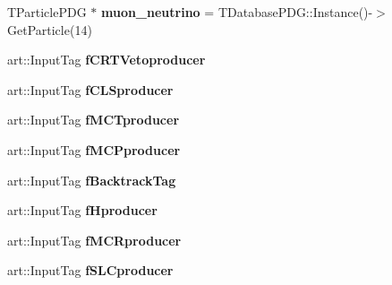 \begin{DoxyCompactItemize}
\item 
\hypertarget{classanalysis_1_1DefaultAnalysis_a0e76c2baabff12b0a3f19aa54c54a59d}{T\-Particle\-P\-D\-G $\ast$ {\bfseries muon\-\_\-neutrino} = T\-Database\-P\-D\-G\-::\-Instance()-\/$>$Get\-Particle(14)}\label{classanalysis_1_1DefaultAnalysis_a0e76c2baabff12b0a3f19aa54c54a59d}

\item 
\hypertarget{classanalysis_1_1DefaultAnalysis_aba3c76b59d2a5b2e24f50b2868c4c045}{art\-::\-Input\-Tag {\bfseries f\-C\-R\-T\-Vetoproducer}}\label{classanalysis_1_1DefaultAnalysis_aba3c76b59d2a5b2e24f50b2868c4c045}

\item 
\hypertarget{classanalysis_1_1DefaultAnalysis_ae4cd0c3f1d34676303c2bf78512b1033}{art\-::\-Input\-Tag {\bfseries f\-C\-L\-Sproducer}}\label{classanalysis_1_1DefaultAnalysis_ae4cd0c3f1d34676303c2bf78512b1033}

\item 
\hypertarget{classanalysis_1_1DefaultAnalysis_a5a9b0c6d9996f8c7198158b3f36acd67}{art\-::\-Input\-Tag {\bfseries f\-M\-C\-Tproducer}}\label{classanalysis_1_1DefaultAnalysis_a5a9b0c6d9996f8c7198158b3f36acd67}

\item 
\hypertarget{classanalysis_1_1DefaultAnalysis_ad10d6b02fc6fcd46a25c30877f1fb634}{art\-::\-Input\-Tag {\bfseries f\-M\-C\-Pproducer}}\label{classanalysis_1_1DefaultAnalysis_ad10d6b02fc6fcd46a25c30877f1fb634}

\item 
\hypertarget{classanalysis_1_1DefaultAnalysis_a8dab9b6e3afeeb11bf7baf043daa5ecd}{art\-::\-Input\-Tag {\bfseries f\-Backtrack\-Tag}}\label{classanalysis_1_1DefaultAnalysis_a8dab9b6e3afeeb11bf7baf043daa5ecd}

\item 
\hypertarget{classanalysis_1_1DefaultAnalysis_a4fbfc54f63dec8d38301ad853ed9f719}{art\-::\-Input\-Tag {\bfseries f\-Hproducer}}\label{classanalysis_1_1DefaultAnalysis_a4fbfc54f63dec8d38301ad853ed9f719}

\item 
\hypertarget{classanalysis_1_1DefaultAnalysis_abf7821b91f9c87b40cbefa49824bebe7}{art\-::\-Input\-Tag {\bfseries f\-M\-C\-Rproducer}}\label{classanalysis_1_1DefaultAnalysis_abf7821b91f9c87b40cbefa49824bebe7}

\item 
\hypertarget{classanalysis_1_1DefaultAnalysis_ac3aef1da86526ce278fc67a56a73d759}{art\-::\-Input\-Tag {\bfseries f\-S\-L\-Cproducer}}\label{classanalysis_1_1DefaultAnalysis_ac3aef1da86526ce278fc67a56a73d759}


\end{DoxyCompactItemize}

